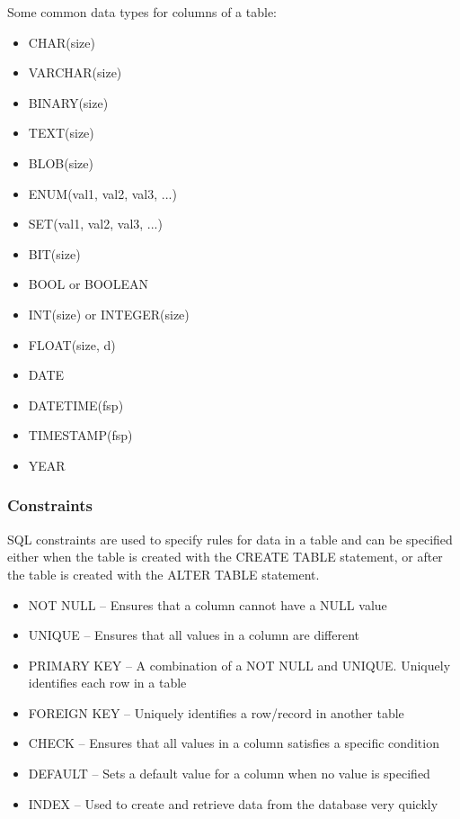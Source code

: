 \documentclass{article}
\begin{document}
Some common data types for columns of a table:
\begin{multicols}{2}
\begin{itemize}
    \item CHAR(size)
    \item VARCHAR(size)
    \item BINARY(size)
    \item TEXT(size)
    \item BLOB(size)
    \item ENUM(val1, val2, val3, ...)
    \item SET(val1, val2, val3, ...)
    \item BIT(size)
    \item BOOL or BOOLEAN
    \item INT(size) or INTEGER(size)
    \item FLOAT(size, d)
    \item DATE
    \item DATETIME(fsp)
    \item TIMESTAMP(fsp)
    \item YEAR
\end{itemize}
\end{multicols}

\subsubsection{Constraints}

SQL constraints are used to specify rules for data in a table and can be specified either when the table is created with the CREATE TABLE statement, or after the table is created with the ALTER TABLE statement.

\begin{itemize}
    \item NOT NULL -- Ensures that a column cannot have a NULL value
    \item UNIQUE -- Ensures that all values in a column are different
    \item PRIMARY KEY -- A combination of a NOT NULL and UNIQUE. Uniquely identifies each row in a table
    \item FOREIGN KEY -- Uniquely identifies a row/record in another table
    \item CHECK -- Ensures that all values in a column satisfies a specific condition
    \item DEFAULT -- Sets a default value for a column when no value is specified
    \item INDEX -- Used to create and retrieve data from the database very quickly
\end{itemize}
\end{document}
